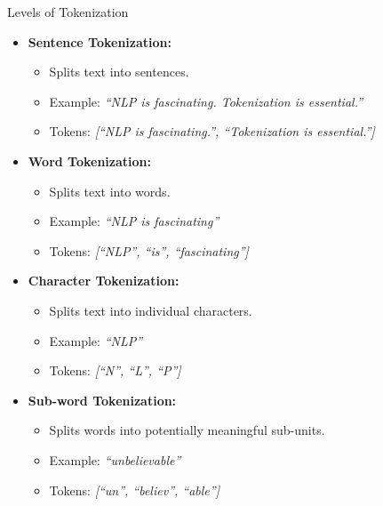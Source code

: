 \documentclass{beamer}
\begin{document}
\begin{frame}{Levels of Tokenization}
    \begin{itemize}
        \item \textbf{Sentence Tokenization:}
        \begin{itemize}
            \item Splits text into sentences.
            \item Example: \textit{“NLP is fascinating. Tokenization is essential.”}
            \item Tokens: \textit{[“NLP is fascinating.”, “Tokenization is essential.”]}
        \end{itemize}
        \item \textbf{Word Tokenization:}
        \begin{itemize}
            \item Splits text into words.
            \item Example: \textit{“NLP is fascinating”}
            \item Tokens: \textit{[“NLP”, “is”, “fascinating”]}
        \end{itemize}
        \item \textbf{Character Tokenization:}
        \begin{itemize}
            \item Splits text into individual characters.
            \item Example: \textit{“NLP”}
            \item Tokens: \textit{[“N”, “L”, “P”]}
        \end{itemize}
        \item \textbf{Sub-word Tokenization:}
        \begin{itemize}
            \item Splits words into potentially meaningful sub-units.
            \item Example: \textit{“unbelievable”}
            \item Tokens: \textit{[“un”, “believ”, “able”]}
        \end{itemize}
    \end{itemize}
\end{frame}
\end{document}
